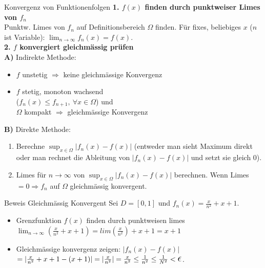 \documentclass[a4paper]{article}
\let\oldepsilon\epsilon
\renewcommand{\epsilon}{\text{\Large $\oldepsilon$}}
\def\limn{\lim_{n\to \infty}}
\begin{document}
\begin{bspbox}{Konvergenz von Funktionenfolgen}
  \textbf{1. $f(x)$ finden durch punktweiser Limes von $f_n$} \\
  Punktw. Limes von $f_n$ auf Definitionsbereich $\Omega$ finden. Für fixes, beliebiges $x$ ($n$ ist Variable): $\lim_{n \rightarrow \infty} f_n(x) = f(x)$. \\
  \textbf{2. $f$ konvergiert gleichmässig prüfen} \\
  \textbf{A)} Indirekte Methode:\\
  \begin{itemize}[leftmargin=4.5mm, topsep=1pt, parsep=1pt]
    \setlength\itemsep{0em}
    \item $f$ unstetig $\Rightarrow$ keine gleichmässige Konvergenz
    \item $f$ stetig, monoton wachsend \\ ($f_n(x) \leq f_{n+1}, \ \forall x \in \Omega$) und \\ $\Omega$ kompakt $\Rightarrow$ gleichmässige Konvergenz
  \end{itemize}
  \textbf{B)} Direkte Methode:\\
  \begin{enumerate}[leftmargin=4.5mm, topsep=1pt, parsep=1pt]
    \setlength\itemsep{0em}
    \item Berechne $\sup_{x \in \Omega} |f_n(x)-f(x)|$ (entweder man sieht Maximum direkt oder man rechnet die Ableitung von $|f_n(x)-f(x)|$ und setzt sie gleich 0).
    \item Limes für $n \rightarrow \infty$ von $\sup_{x \in \Omega} |f_n(x)-f(x)|$ berechnen. Wenn Limes $= 0 \Rightarrow f_n$ auf $\Omega$ gleichmässig konvergent.
  \end{enumerate}
\end{bspbox}


\begin{bspbox}{Beweis Gleichmässig Konvergent}
Sei $D = [0, 1]$ und $f_n(x) = \frac{x}{n^2} + x + 1$. \\
\begin{itemize}[leftmargin=4.5mm, topsep=1pt, parsep=1pt]
  \item[1.] Grenzfunktion $f(x)$ finden durch punktweisen limes \\
            \quad $\limn(\frac{x}{n^2} + x + 1) = lim(\frac{x}{n^2}) + x + 1 = x + 1$ \\
  \item[2.] Gleichmässige konvergenz zeigen:  $|f_n(x) - f(x)|$ \\
            $ = |\frac{x}{n^2} + x + 1 - (x + 1)| = |\frac{x}{n^2}| = \frac{x}{n^2} \leq \frac{1}{n^2} \leq \frac{1}{N^2} < \epsilon$.
\end{itemize}
\end{bspbox}
\end{document}
